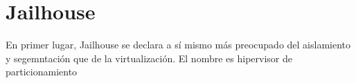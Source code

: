 \section{Jailhouse}

En primer lugar, Jailhouse se declara a sí mismo más preocupado del aislamiento y segemntación que de la virtualización. El nombre es hipervisor de particionamiento
